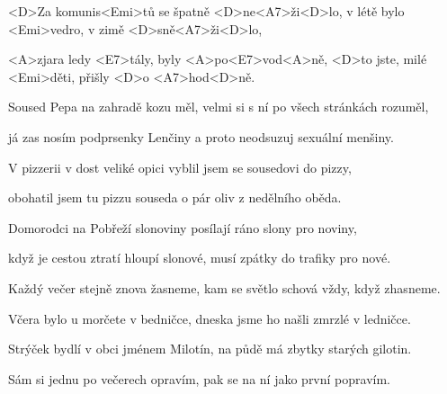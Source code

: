 

\zs
<D>Za komunis<Emi>tů se špatně <D>ne<A7>ži<D>lo,
v létě bylo <Emi>vedro, v zimě <D>sně<A7>ži<D>lo,

<A>zjara ledy <E7>tály, byly <A>po<E7>vod<A>ně,
<D>to jste, milé <Emi>děti, přišly <D>o <A7>hod<D>ně.
\ks

\zs
Soused Pepa na zahradě kozu měl,
velmi si s ní po všech stránkách rozuměl,

já zas nosím podprsenky Lenčiny
a proto neodsuzuj sexuální menšiny.
\ks

\zs
V pizzerii v dost veliké opici
vyblil jsem se sousedovi do pizzy,

obohatil jsem tu pizzu souseda
o pár oliv z nedělního oběda.
\ks

\zs
Domorodci na Pobřeží slonoviny
posílají ráno slony pro noviny,

když je cestou ztratí hloupí slonové,
musí zpátky do trafiky pro nové.
\ks

\zs
Každý večer stejně znova žasneme,
kam se světlo schová vždy, když zhasneme.

Včera bylo u morčete v bedničce,
dneska jsme ho našli zmrzlé v ledničce.
\ks

\zs
Strýček bydlí v obci jménem Milotín,
na půdě má zbytky starých gilotin.

Sám si jednu po večerech opravím,
pak se na ní jako první popravím.
\ks
\kp
